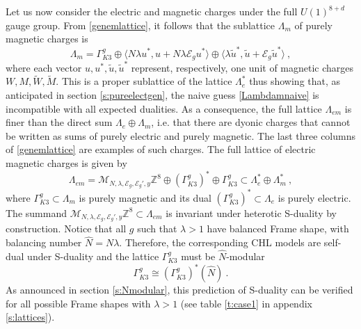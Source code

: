 \documentclass[a4paper,11pt]{article}
\newcommand{\ZZ}{\mathbb{Z}}
\newcommand{\C}{\mathcal{C}}
\newcommand{\E}{\mathcal{E}}
\newcommand{\M}{\mathcal{M}}
\numberwithin{equation}{section}
\def\be{\begin{equation}}
\def\ee{\end{equation}}
\begin{document}
\medskip


Let us now consider the electric and magnetic charges under the full $U(1)^{8+d}$ gauge group. From \eqref{genemlattice}, it follows that the sublattice $\Lambda_m$ of purely magnetic charges is
\be \Lambda_m= \Gamma_{K3}^g\oplus \langle N\lambda u^*,u+N\lambda\E_gu^* \rangle \oplus \langle \lambda \tilde u^*,\tilde u+\E_g\tilde u^*\rangle\ ,
\ee where each vector $u,u^*,\tilde u,\tilde u^*$ represent, respectively, one unit of magnetic charges $W,M,\tilde W,\tilde M$.
This is a proper sublattice of the lattice $\Lambda_e^*$ thus showing that, as anticipated in section \ref{s:pureelectgen}, the naive guess \eqref{Lambdamnaive} is incompatible with all expected dualities. As a consequence, the full lattice $\Lambda_{em}$ is finer than the direct sum $\Lambda_e\oplus\Lambda_m$, i.e. that there are dyonic charges that cannot be written as sums of purely electric and purely magnetic. The last three columns of \eqref{genemlattice} are examples of such charges.
The full lattice of electric magnetic charges is given by
\be \Lambda_{em}=\M_{N,\lambda,\E_g,\E_g',y}\ZZ^8\oplus (\Gamma_{K3}^g)^*\oplus \Gamma_{K3}^g\subset \Lambda_e^*\oplus\Lambda_m^*\ ,
\ee where $\Gamma_{K3}^g\subset \Lambda_m$ is purely magnetic and its dual $(\Gamma_{K3}^g)^*\subset \Lambda_e$ is purely electric. The summand $\M_{N,\lambda,\E_g,\E_g',y}\ZZ^8\subset \Lambda_{em}$ is invariant under heterotic S-duality by construction. Notice that all $g$ such that $\lambda>1$ have balanced Frame shape, with balancing number $\hat N=N\lambda$. Therefore, the corresponding CHL models are self-dual under S-duality and the lattice $\Gamma_{K3}^g$ must be $\hat N$-modular
\be \Gamma_{K3}^g\cong (\Gamma_{K3}^g)^*(\hat N)\ .
\ee As announced in section \ref{s:Nmodular}, this prediction of S-duality can be verified for all possible Frame shapes with $\lambda>1$ (see table \ref{t:case1} in appendix \ref{s:lattices}).

%
%
%
\end{document}
